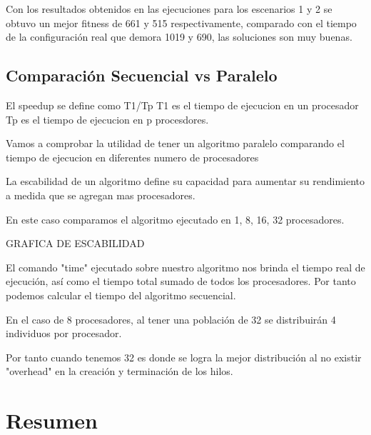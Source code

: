 Con  los  resultados  obtenidos  en  las  ejecuciones  para  los
escenarios  1  y  2  se  obtuvo  un  mejor  fitness  de  661  y  515
respectivamente, comparado con el tiempo de la configuración
real que demora 1019 y 690, las soluciones son muy buenas.



\subsection{Comparación Secuencial vs  Paralelo}

El speedup se define como T1/Tp
T1 es el tiempo de ejecucion en un procesador
Tp es el tiempo de ejecucion en p procesdores.


Vamos a comprobar la utilidad de tener un algoritmo paralelo comparando el tiempo de ejecucion en diferentes numero de procesadores

La escabilidad de un algoritmo define su capacidad para aumentar su rendimiento a medida que se agregan mas procesadores.

En este caso comparamos el algoritmo ejecutado en 1, 8, 16, 32 procesadores.

GRAFICA DE ESCABILIDAD

El comando "time" ejecutado sobre nuestro algoritmo nos brinda el tiempo real de ejecución, así como el tiempo total sumado de todos los procesadores. Por tanto podemos calcular el tiempo del algoritmo secuencial.

En el caso de 8 procesadores, al tener una población de 32 se distribuirán 4 individuos por procesador.

Por tanto cuando tenemos 32 es donde se logra la mejor distribución al no existir "overhead" en la creación y terminación de los hilos.


\section{Resumen}

